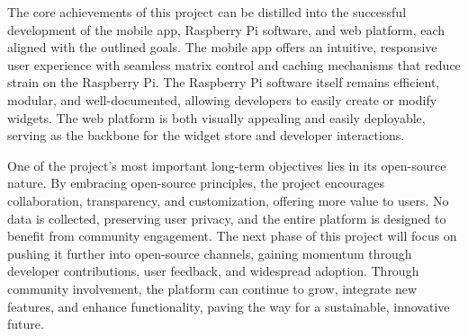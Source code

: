 The core achievements of this project can be distilled into the successful development of the mobile app, Raspberry Pi software, and web platform, each aligned with the outlined goals. The mobile app offers an intuitive, responsive user experience with seamless matrix control and caching mechanisms that reduce strain on the Raspberry Pi. The Raspberry Pi software itself remains efficient, modular, and well-documented, allowing developers to easily create or modify widgets. The web platform is both visually appealing and easily deployable, serving as the backbone for the widget store and developer interactions.

One of the project’s most important long-term objectives lies in its open-source nature. By embracing open-source principles, the project encourages collaboration, transparency, and customization, offering more value to users. No data is collected, preserving user privacy, and the entire platform is designed to benefit from community engagement. The next phase of this project will focus on pushing it further into open-source channels, gaining momentum through developer contributions, user feedback, and widespread adoption. Through community involvement, the platform can continue to grow, integrate new features, and enhance functionality, paving the way for a sustainable, innovative future.